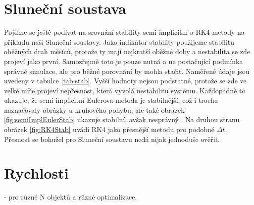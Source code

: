 \section{Sluneční soustava}
Pojďme se ještě podívat na srovnání stability semi-implicitní a RK4 metody na příkladu naší Sluneční soustavy. Jako indikátor stability použijeme stabilitu oběžných drah měsíců, protože ty mají nejkratší oběžné doby a nestabilita se zde projeví jako první. Samozřejmě toto je pouze nutná a ne postačující podmínka správné simulace, ale pro běžné porovnání by mohla stačit. Naměřené údaje jsou uvedeny v tabulce \ref{tab:stab}. Vyšší hodnoty nejsou podstatné, protože se zde ve velké míře projeví nepřesnost, která vyvolá nestabilitu systému. Každopádně to ukazuje, že semi-implicitní Eulerova metoda je stabilnější, což i trochu naznačovaly obrázky u kruhového pohybu, ale také obrázek \ref{fig:semiImplEulerStab} ukazuje stabilní, avšak nesprávný . Na druhou stranu obrázek \ref{fig:RK4Stab} uvádí RK4 jako přesnější metodu pro podobné $ \Delta t $. Přesnost se bohužel pro Sluneční soustavu nedá nijak jednoduše ověřit. 

\section{Rychlosti}
- pro různé N objektů a různé optimalizace.

